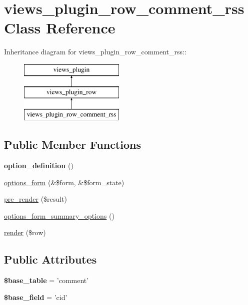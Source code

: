 \hypertarget{classviews__plugin__row__comment__rss}{
\section{views\_\-plugin\_\-row\_\-comment\_\-rss Class Reference}
\label{classviews__plugin__row__comment__rss}
}
Inheritance diagram for views\_\-plugin\_\-row\_\-comment\_\-rss::\begin{figure}[H]
\begin{center}
\leavevmode
\includegraphics[height=3cm]{classviews__plugin__row__comment__rss}
\end{center}
\end{figure}
\subsection*{Public Member Functions}
\begin{DoxyCompactItemize}
\item 
\hypertarget{classviews__plugin__row__comment__rss_ae644bfd8ebe7cac3f31edb2b92d0cff7}{
{\bfseries option\_\-definition} ()}
\label{classviews__plugin__row__comment__rss_ae644bfd8ebe7cac3f31edb2b92d0cff7}

\item 
\hyperlink{classviews__plugin__row__comment__rss_a6901603f7a3b8765dff9ac0b5d8208e4}{options\_\-form} (\&\$form, \&\$form\_\-state)
\item 
\hyperlink{classviews__plugin__row__comment__rss_a1c64dc0cd4f677ddb85a0dbedfae291e}{pre\_\-render} (\$result)
\item 
\hyperlink{classviews__plugin__row__comment__rss_a62f1381c8f5def6a790685208be61dae}{options\_\-form\_\-summary\_\-options} ()
\item 
\hyperlink{classviews__plugin__row__comment__rss_a89b115cbc1807d3b9659627f351b97e7}{render} (\$row)
\end{DoxyCompactItemize}
\subsection*{Public Attributes}
\begin{DoxyCompactItemize}
\item 
\hypertarget{classviews__plugin__row__comment__rss_a7b96301e4d4e2a8d6f9461dea688b16b}{
{\bfseries \$base\_\-table} = 'comment'}
\label{classviews__plugin__row__comment__rss_a7b96301e4d4e2a8d6f9461dea688b16b}

\item 
\hypertarget{classviews__plugin__row__comment__rss_a649761b2325dacc408e94765e7310367}{
{\bfseries \$base\_\-field} = 'cid'}
\label{classviews__plugin__row__comment__rss_a649761b2325dacc408e94765e7310367}

\end{DoxyCompactItemize}


